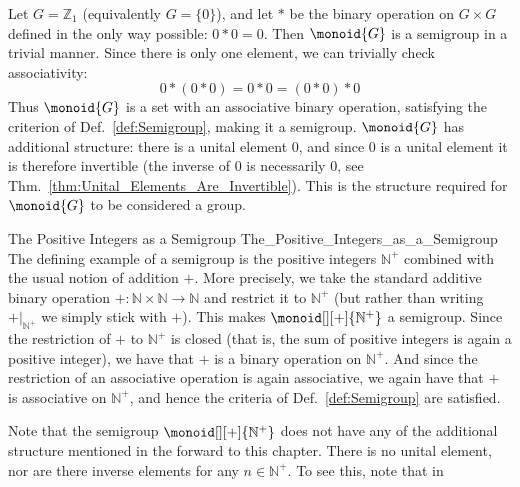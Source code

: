         \begin{example}
            Let $G=\mathbb{Z}_{1}$ (equivalently $G=\{0\}$), and let $*$ be the
            binary operation on $G\times{G}$ defined in the only way possible:
            $0*0=0$. Then $\monoid{G}$ is a semigroup in a trivial manner. Since
            there is only one element, we can trivially check associativity:
            \begin{equation}
                0*(0*0)=0*0=(0*0)*0
            \end{equation}
            Thus $\monoid{G}$ is a set with an associative binary operation,
            satisfying the criterion of Def.~\ref{def:Semigroup}, making it a
            semigroup. $\monoid{G}$ has additional structure: there is a unital
            element 0, and since 0 is a unital element it is therefore invertible
            (the inverse of 0 is necessarily 0, see
            Thm.~\ref{thm:Unital_Elements_Are_Invertible}). This is the structure
            required for $\monoid{G}$ to be considered a group.
        \end{example}
        \begin{fexample}{The Positive Integers as a Semigroup}
                        {The_Positive_Integers_as_a_Semigroup}
            The defining example of a semigroup is the positive integers
            $\mathbb{N}^{+}$ combined with the usual notion of addition $+$.
            More precisely, we take the standard additive binary operation
            $+:\mathbb{N}\times\mathbb{N}\rightarrow\mathbb{N}$ and restrict it
            to $\mathbb{N}^{+}$ (but rather than writing $+|_{\mathbb{N}^{+}}$
            we simply stick with $+$). This makes $\monoid[][+]{\mathbb{N}^{+}}$
            a semigroup. Since the restriction of $+$ to $\mathbb{N}^{+}$ is
            closed (that is, the sum of positive integers is again a positive
            integer), we have that $+$ is a binary operation on
            $\mathbb{N}^{+}$. And since the restriction of an associative
            operation is again associative, we again have that $+$ is
            associative on $\mathbb{N}^{+}$, and hence the criteria of
            Def.~\ref{def:Semigroup} are satisfied.
        \end{fexample}
        Note that the semigroup $\monoid[][+]{\mathbb{N}^{+}}$ does not have any
        of the additional structure mentioned in the forward to this chapter.
        There is no unital element, nor are there inverse elements for any
        $n\in\mathbb{N}^{+}$. To see this, note that in
